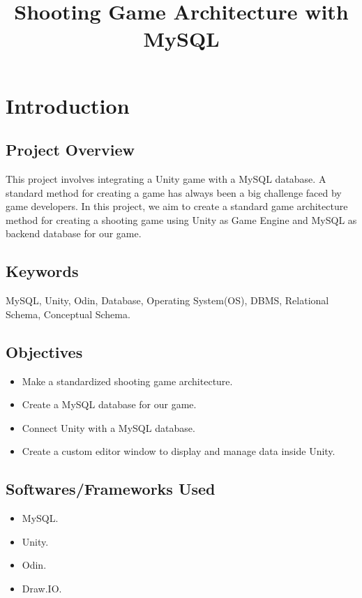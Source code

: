 \documentclass[12pt]{report}
\title{Shooting Game Architecture with MySQL}
\begin{document}


\date{}
\maketitle

\tableofcontents

\chapter{Introduction}

\section{Project Overview}
This project involves integrating a Unity game with a MySQL database. A standard method for creating a game has always been a big challenge faced by game developers. In this project, we aim to create a standard game architecture method for creating a shooting game using Unity as Game Engine and MySQL as backend database for our game.

\section{Keywords}
MySQL, Unity, Odin, Database, Operating System(OS), DBMS, Relational Schema, Conceptual Schema.

\section{Objectives}
\begin{itemize}
    \item Make a standardized shooting game architecture.
    \item Create a MySQL database for our game.
		\item Connect Unity with a MySQL database.
    \item Create a custom editor window to display and manage data inside Unity.
\end{itemize}

\section{Softwares/Frameworks Used}
\begin{itemize}
		\item MySQL.
    \item Unity.
    \item Odin.
    \item Draw.IO.
\end{itemize}
\end{document}
